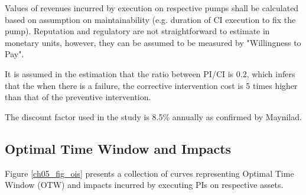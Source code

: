 Values of revenues incurred by execution on respective pumps shall be calculated based on assumption on maintainability (e.g. duration of CI execution to fix the pump). Reputation and regulatory are not straightforward to estimate in monetary units, however, they can be assumed to be measured by "Willingness to Pay".

It is assumed in the estimation that the ratio between PI/CI is 0.2, which infers that the when there is a failure, the corrective intervention cost is 5 times higher than that of the preventive intervention.

The discount factor used in the study is 8.5\% annually as confirmed by Maynilad.


\subsection{Optimal Time Window and Impacts}
Figure \ref{ch05_fig_ois} presents a collection of curves representing Optimal Time Window (OTW) and impacts incurred by executing PIs on respective assets.
